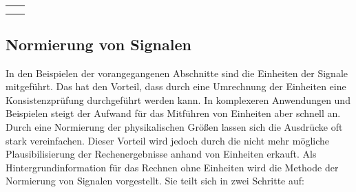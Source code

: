 \begin{table}[H]
{\begin{tabular}{| c | c |}
\parbox[c][0.64in][c]{3.3in}{} &
\parbox[c][0.64in][c]{3.3in}{}\\ \hline

\parbox[c][0.64in][c]{3.3in}{} & 
\parbox[c][0.64in][c]{3.3in}{}\\ \hline

\parbox[c][1.4in][c]{3.3in}{} &
\parbox[c][1.4in][c]{3.3in}{}\\ \hline


\end{tabular}%
}
\label{tab:twofive}
\end{table}


\clearpage

\subsection{ Normierung von Signalen}

\noindent In den Beispielen der vorangegangenen Abschnitte sind die Einheiten der Signale mitgef\"{u}hrt. Das hat den Vorteil, dass durch eine Umrechnung der Einheiten eine Konsistenzpr\"{u}fung durchgef\"{u}hrt werden kann. In komplexeren Anwendungen und Beispielen steigt der Aufwand f\"{u}r das Mitf\"{u}hren von Einheiten aber schnell an. Durch eine Normierung der physikalischen Gr\"{o}{\ss}en lassen sich die Ausdr\"{u}cke oft stark vereinfachen. Dieser Vorteil wird jedoch durch die nicht mehr m\"{o}gliche Plausibilisierung der Rechenergebnisse anhand von Einheiten erkauft. Als Hintergrundinformation f\"{u}r das Rechnen ohne Einheiten wird die Methode der Normierung von Signalen vorgestellt. Sie teilt sich in zwei Schritte auf:

